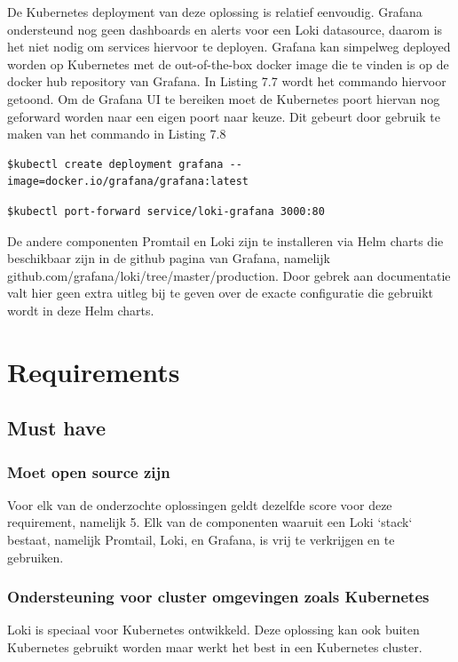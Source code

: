 De Kubernetes deployment van deze oplossing is relatief eenvoudig. Grafana ondersteund nog geen dashboards en alerts voor een Loki datasource, daarom is het niet nodig om services hiervoor te deployen. Grafana kan simpelweg deployed worden op Kubernetes met de out-of-the-box docker image die te vinden is op de docker hub repository van Grafana. In Listing 7.7 wordt het commando hiervoor getoond. Om de Grafana UI te bereiken moet de Kubernetes poort hiervan nog geforward worden naar een eigen poort naar keuze. Dit gebeurt door gebruik te maken van het commando in Listing 7.8\\

\begin{lstlisting}[caption=Grafana Kubernetes deployment]
$kubectl create deployment grafana --image=docker.io/grafana/grafana:latest
\end{lstlisting}
\begin{lstlisting}[caption=Port-forwarding van Grafana]
$kubectl port-forward service/loki-grafana 3000:80
\end{lstlisting}

De andere componenten Promtail en Loki zijn te installeren via Helm charts die beschikbaar zijn in de github pagina van Grafana, namelijk github.com/grafana/loki/tree/master/production. Door gebrek aan documentatie valt hier geen extra uitleg bij te geven over de exacte configuratie die gebruikt wordt in deze Helm charts.


\section{Requirements}

\subsection{Must have}
\subsubsection{Moet open source zijn}
Voor elk van de onderzochte oplossingen geldt dezelfde score voor deze requirement, namelijk 5. Elk van de componenten waaruit een Loki `stack` bestaat, namelijk Promtail, Loki, en Grafana, is vrij te verkrijgen en te gebruiken.

\subsubsection{Ondersteuning voor cluster omgevingen zoals Kubernetes}
Loki is speciaal voor Kubernetes ontwikkeld. Deze oplossing kan ook buiten Kubernetes gebruikt worden maar werkt het best in een Kubernetes cluster. 

